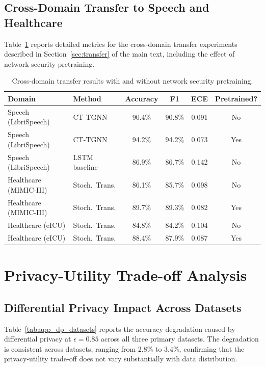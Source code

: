 \subsection{Cross-Domain Transfer to Speech and Healthcare}
\label{app:cross_domain_detail}

Table~\ref{tab:app_cross_domain} reports detailed metrics for the cross-domain transfer experiments described in Section~\ref{sec:transfer} of the main text, including the effect of network security pretraining.

\begin{table}[htbp]
\centering
\caption{Cross-domain transfer results with and without network security pretraining.}
\label{tab:app_cross_domain}
\begin{tabular}{llcccc}
\toprule
Domain & Method & Accuracy & F1 & ECE & Pretrained? \\
\midrule
Speech (LibriSpeech) & CT-TGNN & 90.4\% & 90.8\% & 0.091 & No \\
Speech (LibriSpeech) & CT-TGNN & 94.2\% & 94.2\% & 0.073 & Yes \\
Speech (LibriSpeech) & LSTM baseline & 86.9\% & 86.7\% & 0.142 & No \\
\midrule
Healthcare (MIMIC-III) & Stoch.\ Trans. & 86.1\% & 85.7\% & 0.098 & No \\
Healthcare (MIMIC-III) & Stoch.\ Trans. & 89.7\% & 89.3\% & 0.082 & Yes \\
Healthcare (eICU) & Stoch.\ Trans. & 84.8\% & 84.2\% & 0.104 & No \\
Healthcare (eICU) & Stoch.\ Trans. & 88.4\% & 87.9\% & 0.087 & Yes \\
\bottomrule
\end{tabular}
\end{table}


\section{Privacy-Utility Trade-off Analysis}
\label{app:privacy_utility}

\subsection{Differential Privacy Impact Across Datasets}
\label{app:dp_impact}

Table~\ref{tab:app_dp_datasets} reports the accuracy degradation caused by differential privacy at $\epsilon=0.85$ across all three primary datasets. The degradation is consistent across datasets, ranging from 2.8\% to 3.4\%, confirming that the privacy-utility trade-off does not vary substantially with data distribution.

